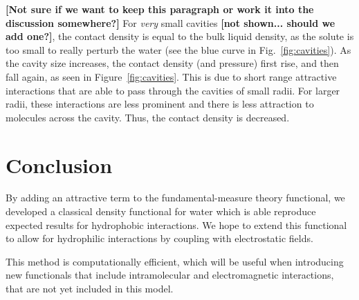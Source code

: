 \documentclass[letterpaper,twocolumn,amsmath,amssymb,prb]{revtex4}
\newcommand{\red}[1]{{\bf \color{red} #1}}
\newcommand{\fixme}[1]{\red{[#1]}}
\begin{document}
\fixme{Not sure if we want to keep this paragraph or work it into the
  discussion somewhere?} For \emph{very} small cavities \fixme{not
  shown... should we add one?}, the contact density is equal to the
bulk liquid density, as the solute is too small to really perturb the
water (see the blue curve in Fig.~\ref{fig:cavities}).  As the cavity
size increases, the contact density (and pressure) first rise, and
then fall again, as seen in Figure~\ref{fig:cavities}.  This is due to
short range attractive interactions that are able to pass through the
cavities of small radii.  For larger radii, these interactions are
less prominent and there is less attraction to molecules across the
cavity.  Thus, the contact density is decreased.

\section{Conclusion}
By adding an attractive term to the fundamental-measure theory
functional, we developed a classical density functional for water
which is able reproduce expected results for hydrophobic
interactions.  We hope to extend this functional to allow for
hydrophilic interactions by coupling with electrostatic fields.

This method is computationally efficient, which will be useful when
introducing new functionals that include intramolecular and electromagnetic
interactions, that are not yet included in this model.

\end{document}
